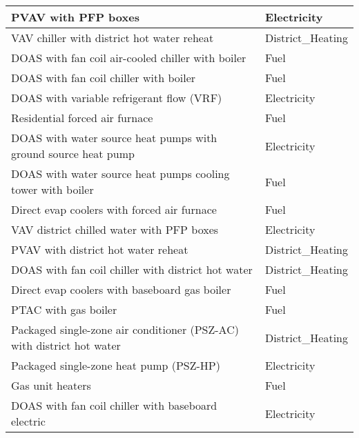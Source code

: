\begin{table}[hb!]
\begin{tabular}{|l|l|}
PVAV with PFP boxes                                         & Electricity                    \\ \hline
VAV chiller with district hot water reheat                  & District\_Heating              \\ \hline
DOAS with fan coil air-cooled chiller with boiler           & Fuel                           \\ \hline
DOAS with fan coil chiller with boiler                      & Fuel                           \\ \hline
DOAS with variable refrigerant flow (VRF)                                               & Electricity                    \\ \hline
Residential forced air furnace                              & Fuel                           \\ \hline
DOAS with water source heat pumps with ground source heat pump    & Electricity              \\ \hline
DOAS with water source heat pumps cooling tower with boiler & Fuel                           \\ \hline
Direct evap coolers with forced air furnace                 & Fuel                           \\ \hline
VAV district chilled water with PFP boxes                   & Electricity                    \\ \hline
PVAV with district hot water reheat                         & District\_Heating              \\ \hline
DOAS with fan coil chiller with district hot water          & District\_Heating              \\ \hline
Direct evap coolers with baseboard gas boiler               & Fuel                           \\ \hline
PTAC with gas boiler                                        & Fuel                           \\ \hline
Packaged single-zone air conditioner (PSZ-AC) with district hot water                              & District\_Heating              \\ \hline
Packaged single-zone heat pump (PSZ-HP)                                                      & Electricity                    \\ \hline
Gas unit heaters                                            & Fuel                           \\ \hline
DOAS with fan coil chiller with baseboard electric          & Electricity                    \\ \hline

\end{tabular}
\end{table}
